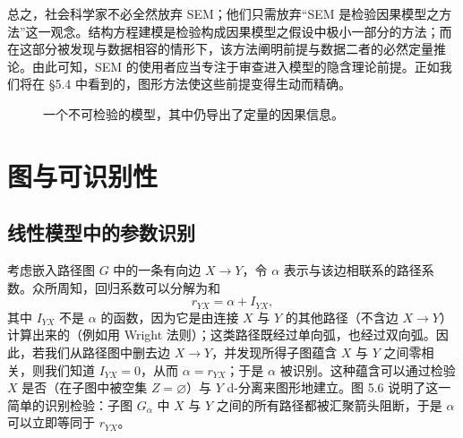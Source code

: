 总之，社会科学家不必全然放弃 SEM；他们只需放弃“SEM 是检验因果模型之方法”这一观念。结构方程建模是检验构成因果模型之假设中极小一部分的方法；而在这部分被发现与数据相容的情形下，该方法阐明前提与数据二者的必然定量推论。由此可知，SEM 的使用者应当专注于审查进入模型的隐含理论前提。正如我们将在 \S 5.4 中看到的，图形方法使这些前提变得生动而精确。

\begin{figure}[htbp]
\centering
{}
\caption{一个不可检验的模型，其中仍导出了定量的因果信息。}
\label{fig:5.5}
\end{figure}

\section{图与可识别性}

\subsection{线性模型中的参数识别}

考虑嵌入路径图 $G$ 中的一条有向边 $X\to Y$，令 $\alpha$ 表示与该边相联系的路径系数。众所周知，回归系数可以分解为和
\[
r_{YX}=\alpha+I_{YX},
\]
其中 $I_{YX}$ 不是 $\alpha$ 的函数，因为它是由连接 $X$ 与 $Y$ 的其他路径（不含边 $X\to Y$）计算出来的（例如用 Wright 法则）；这类路径既经过单向弧，也经过双向弧。因此，若我们从路径图中删去边 $X\to Y$，并发现所得子图蕴含 $X$ 与 $Y$ 之间零相关，则我们知道 $I_{YX}=0$，从而 $\alpha=r_{YX}$；于是 $\alpha$ 被识别。这种蕴含可以通过检验 $X$ 是否（在子图中被空集 $Z=\varnothing$）与 $Y$ d-分离来图形地建立。图 5.6 说明了这一简单的识别检验：子图 $G_\alpha$ 中 $X$ 与 $Y$ 之间的所有路径都被汇聚箭头阻断，于是 $\alpha$ 可以立即等同于 $r_{YX}$。

